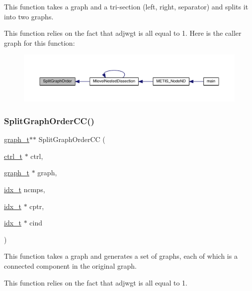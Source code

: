 This function takes a graph and a tri-\/section (left, right, separator) and splits it into two graphs.

This function relies on the fact that adjwgt is all equal to 1. Here is the caller graph for this function\+:\nopagebreak
\begin{figure}[H]
\begin{center}
\leavevmode
\includegraphics[width=350pt]{a00945_a2554253b42e739ac3bb63e676741e1cd_icgraph}
\end{center}
\end{figure}
\mbox{\label{a00945_a52a083cfb474124f22728e79cfba695f}} 
\subsubsection{\texorpdfstring{Split\+Graph\+Order\+C\+C()}{SplitGraphOrderCC()}}
{\footnotesize\ttfamily \hyperlink{a00734}{graph\+\_\+t}$\ast$$\ast$ Split\+Graph\+Order\+CC (\begin{DoxyParamCaption}\item[{\hyperlink{a00742}{ctrl\+\_\+t} $\ast$}]{ctrl,  }\item[{\hyperlink{a00734}{graph\+\_\+t} $\ast$}]{graph,  }\item[{\hyperlink{a00876_aaa5262be3e700770163401acb0150f52}{idx\+\_\+t}}]{ncmps,  }\item[{\hyperlink{a00876_aaa5262be3e700770163401acb0150f52}{idx\+\_\+t} $\ast$}]{cptr,  }\item[{\hyperlink{a00876_aaa5262be3e700770163401acb0150f52}{idx\+\_\+t} $\ast$}]{cind }\end{DoxyParamCaption})}

This function takes a graph and generates a set of graphs, each of which is a connected component in the original graph.

This function relies on the fact that adjwgt is all equal to 1.


